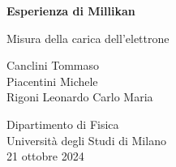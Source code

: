 \begin{titlepage}
    \begin{center}
        \vspace*{1cm}
            
        \Huge
        \textbf{Esperienza di Millikan}
            
        \vspace{0.5cm}
        \LARGE
        Misura della carica dell'elettrone            
        \vspace{1.5cm}
            
        Canclini Tommaso\\
        Piacentini Michele\\
        Rigoni Leonardo Carlo Maria
            
        \vfill
            
        \vspace{0.8cm}
            
            
        \Large
        Dipartimento di Fisica\\
        Università degli Studi di Milano\\
        21 ottobre 2024
            
    \end{center}
\end{titlepage}